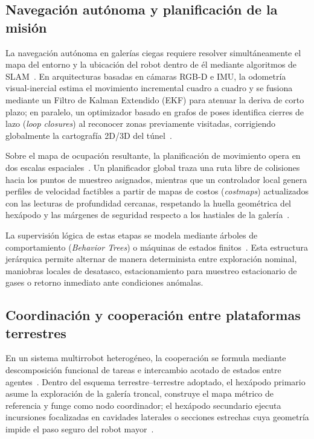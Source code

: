 \subsection{Navegación autónoma y planificación de la misión}

La navegación autónoma en galerías ciegas requiere resolver simultáneamente el mapa del entorno y la ubicación del robot dentro de él mediante algoritmos de SLAM~\cite{thrun2005probabilistic, cadena2016past}. En arquitecturas basadas en cámaras RGB-D e IMU, la odometría visual-inercial estima el movimiento incremental cuadro a cuadro y se fusiona mediante un Filtro de Kalman Extendido (EKF) para atenuar la deriva de corto plazo; en paralelo, un optimizador basado en grafos de poses identifica cierres de lazo (\textit{loop closures}) al reconocer zonas previamente visitadas, corrigiendo globalmente la cartografía 2D/3D del túnel~\cite{cadena2016past, KimChoi_2025_MineMapping}.

Sobre el mapa de ocupación resultante, la planificación de movimiento opera en dos escalas espaciales~\cite{lavalle2006planning}. Un planificador global traza una ruta libre de colisiones hacia los puntos de muestreo asignados, mientras que un controlador local genera perfiles de velocidad factibles a partir de mapas de costos (\textit{costmaps}) actualizados con las lecturas de profundidad cercanas, respetando la huella geométrica del hexápodo y las márgenes de seguridad respecto a los hastiales de la galería~\cite{borenstein1991vector, AdvancesMining_2023, MINEM_DS024_2016}.

La supervisión lógica de estas etapas se modela mediante árboles de comportamiento (\textit{Behavior Trees}) o máquinas de estados finitos~\cite{brooks1986robust}. Esta estructura jerárquica permite alternar de manera determinista entre exploración nominal, maniobras locales de desatasco, estacionamiento para muestreo estacionario de gases o retorno inmediato ante condiciones anómalas.

\subsection{Coordinación y cooperación entre plataformas terrestres}

En un sistema multirrobot heterogéneo, la cooperación se formula mediante descomposición funcional de tareas e intercambio acotado de estados entre agentes~\cite{olfati2007consensus, ren2007information}. Dentro del esquema terrestre--terrestre adoptado, el hexápodo primario asume la exploración de la galería troncal, construye el mapa métrico de referencia y funge como nodo coordinador; el hexápodo secundario ejecuta incursiones focalizadas en cavidades laterales o secciones estrechas cuya geometría impide el paso seguro del robot mayor~\cite{InsectInspired_2020, DungBeetle_2023_Cybernetics}.

